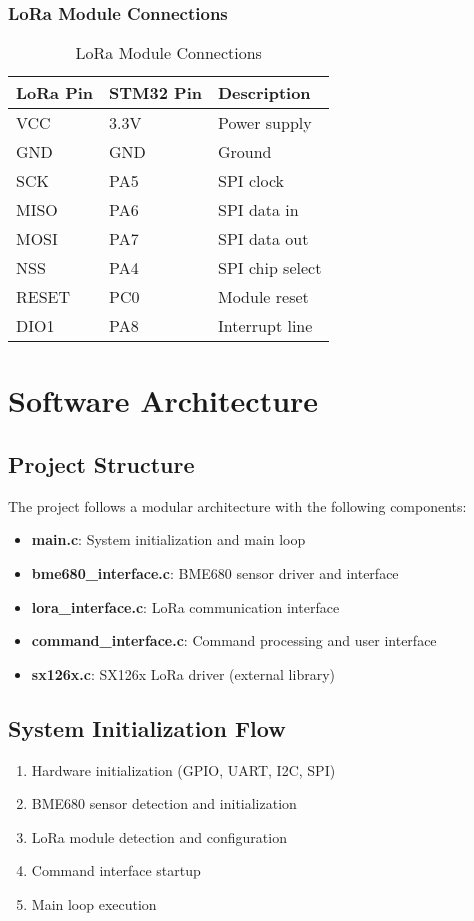 \documentclass[11pt,a4paper]{article}
\begin{document}
\subsubsection{LoRa Module Connections}
\begin{table}[h]
\centering
\begin{tabular}{|l|l|l|}
\hline
\textbf{LoRa Pin} & \textbf{STM32 Pin} & \textbf{Description} \\
\hline
VCC & 3.3V & Power supply \\
\hline
GND & GND & Ground \\
\hline
SCK & PA5 & SPI clock \\
\hline
MISO & PA6 & SPI data in \\
\hline
MOSI & PA7 & SPI data out \\
\hline
NSS & PA4 & SPI chip select \\
\hline
RESET & PC0 & Module reset \\
\hline
DIO1 & PA8 & Interrupt line \\
\hline
\end{tabular}
\caption{LoRa Module Connections}
\end{table}

\section{Software Architecture}

\subsection{Project Structure}
The project follows a modular architecture with the following components:

\begin{itemize}
    \item \textbf{main.c}: System initialization and main loop
    \item \textbf{bme680\_interface.c}: BME680 sensor driver and interface
    \item \textbf{lora\_interface.c}: LoRa communication interface
    \item \textbf{command\_interface.c}: Command processing and user interface
    \item \textbf{sx126x.c}: SX126x LoRa driver (external library)
\end{itemize}

\subsection{System Initialization Flow}
\begin{enumerate}
    \item Hardware initialization (GPIO, UART, I2C, SPI)
    \item BME680 sensor detection and initialization
    \item LoRa module detection and configuration
    \item Command interface startup
    \item Main loop execution
\end{enumerate}
\end{document}
